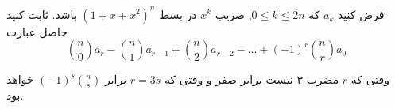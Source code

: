فرض کنید 
$a_k$
كه
$0 \leq k \leq 2n$,
 ضریب 
 $x^k$ در بسط $(1 + x + x^2)^n$ باشد.
ثابت کنید حاصل عبارت
$${n \choose 0}a_r - {n \choose 1}a_{r - 1} + {n \choose 2}a_{r - 2} - ... + (-1)^r{n \choose r}a_0$$

وقتی که $r$ مضرب ۳ نیست برابر صفر و وقتی که 
$r = 3s$ 
برابر 
$(-1)^s{n \choose s}$ 
خواهد بود.